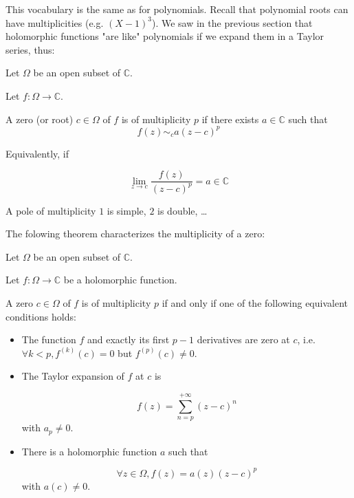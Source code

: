 This vocabulary is the same as for polynomials. Recall that polynomial roots can have multiplicities (e.g. $(X-1)^3$). We saw in the previous section that holomorphic functions "are like" polynomials if we expand them in a Taylor series, thus:

\begin{defi}
    [Zero]
    Let $\Omega$ be an open subset of $\mathbb{C}$.

    Let $f: \Omega \rightarrow \mathbb{C}$.

    A zero (or root) $c\in\Omega$ of $f$ is of multiplicity $p$ if there exists $a\in\mathbb{C}$ such that
    $$ f(z) \sim_{c}a(z-c)^p $$
    
    Equivalently, if 

    $$\lim_{z\rightarrow c} \frac{f(z)}{(z-c)^p} =a \in\mathbb{C}$$

    A pole of multiplicity $ 1$ is simple, $2$ is double, \dots 
\end{defi}


The folowing theorem characterizes the multiplicity of a zero:
\begin{thm*}
    Let $\Omega$ be an open subset of $\mathbb{C}$.

    Let $f: \Omega \rightarrow \mathbb{C}$ be a holomorphic function.

    A zero $c\in\Omega$ of $f$ is of multiplicity $p$ if and only if one of the following equivalent conditions holds:

    \begin{itemize}
        \item The function $f$ and exactly its first $p-1$ derivatives are zero at $c$, i.e. $\forall k < p, f^{(k)}(c) = 0$ but $f^{(p)}(c) \neq 0$.

        \item The Taylor expansion of $f$ at $c$ is 

            $$ f(z) = \sum_{n=p}^{+\infty}(z-c)^n$$ with $a_p\neq 0$.

        \item There is a holomorphic function $a$ such that 

            $$ \forall z\in\Omega, f(z) = a(z) (z-c)^p$$
            with $a(c) \neq 0$.
    \end{itemize}


\end{thm*}

